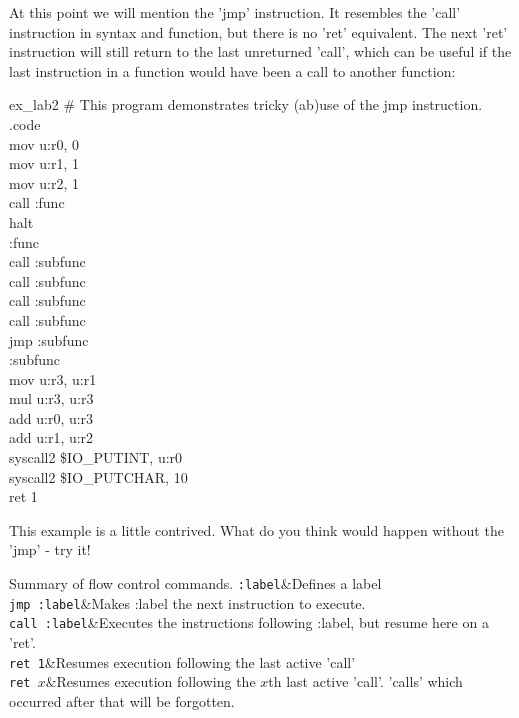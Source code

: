 \documentclass[a4paper,oneside,openany]{book}
\begin{document}
At this point we will mention the 'jmp' instruction. It resembles the 'call' instruction in syntax and function, but there is no 'ret' equivalent. The next 'ret' instruction will still return to the last unreturned 'call', which can be useful if the last instruction in a function would have been a call to another function:
\begin{codefile}{ex\_lab2}
\# This program demonstrates tricky (ab)use of the jmp instruction.\\
.code\\
\>	mov u:r0, 0\\
\>	mov u:r1, 1\\
\>	mov u:r2, 1\\
\>	call :func\\
\>	halt\\
:func\\
\>	call :subfunc\\
\>	call :subfunc\\
\>	call :subfunc\\
\>	call :subfunc\\
\>	jmp :subfunc\\
:subfunc\\
\>	mov u:r3, u:r1\\
\>	mul u:r3, u:r3\\
\>	add u:r0, u:r3\\
\>	add u:r1, u:r2\\
\>	syscall2 \$IO\_PUTINT, u:r0\\
\>	syscall2 \$IO\_PUTCHAR, 10\\
\>	ret 1
\end{codefile}
This example is a little contrived. What do you think would happen without the 'jmp' - try it!\\
\begin{codetablefig}{Summary of flow control commands.}
\texttt{:label}&Defines a label\\
\texttt{jmp :label}&Makes :label the next instruction to execute.\\
\texttt{call :label}&Executes the instructions following :label, but resume here on a 'ret'.\\
\texttt{ret 1}&Resumes execution following the last active 'call'\\
\texttt{ret $x$}&Resumes execution following the $x$th last active 'call'. 'calls' which occurred after that will be forgotten.\\
\end{codetablefig}
\end{document}
